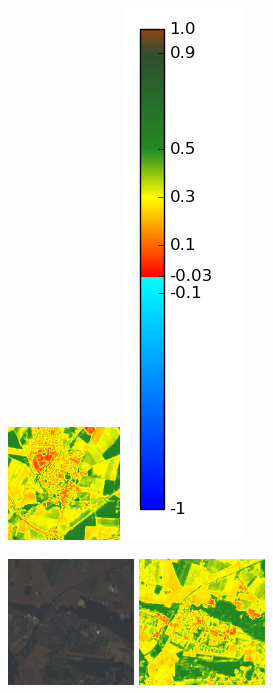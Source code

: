 \documentclass{book}
\begin{document}
\begin{figure}[H]
{\includegraphics[scale=0.9]{../3_ndvi/images/Louvres/07_ndvi.png}
\includegraphics[scale=0.3]{../3_ndvi/images/colormap.png}
}
\centerline{
\includegraphics[scale=0.9]{../3_ndvi/images/Limours/07_rgb.png}
\includegraphics[scale=0.9]{../3_ndvi/images/Limours/07_ndvi.png}
}
\end{figure}
\end{document}
